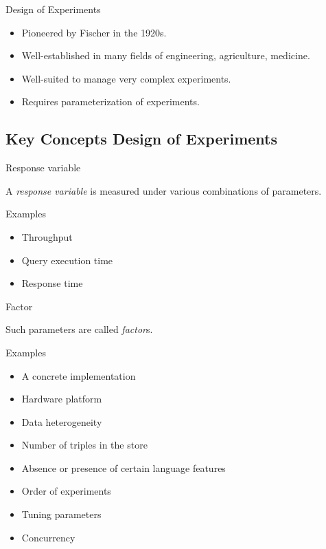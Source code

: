 \documentclass[english,usenames,dvipsnames,aspectratio=169]{beamer}
\begin{document}
\begin{frame}{Design of Experiments}

  \begin{itemize}
  \item Pioneered by Fischer in the 1920s.
  \item Well-established in many fields of engineering, agriculture,
    medicine.
  \item Well-suited to manage very complex experiments.
  \item Requires parameterization of experiments.
  \end{itemize}
\end{frame}

\subsection{Key Concepts Design of Experiments}

\begin{frame}{Response variable}

 \Large
   A \emph{response variable} is measured under various
    combinations of parameters.
 \normalsize
      

    \begin{block}{Examples}
      \begin{itemize}
      \item Throughput
      \item Query execution time
      \item Response time
      \end{itemize}
    \end{block}

\end{frame}

\begin{frame}{Factor}

\Large
Such parameters are called \emph{factor}s. 
\normalsize

\begin{block}{Examples}
  \begin{itemize}
  \item A concrete implementation
  \item Hardware platform
  \item Data heterogeneity
  \item Number of triples in the store
  \item Absence or presence of certain language features
  \item Order of experiments
  \item Tuning parameters
  \item Concurrency
  \end{itemize}
\end{block}

\end{frame}
\end{document}
